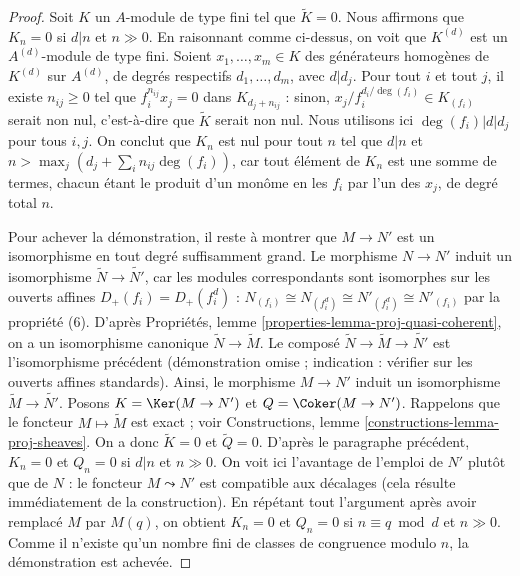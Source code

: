 \begin{proof}
\medskip\noindent
Soit $K$ un $A$-module de type fini tel que $\widetilde{K} = 0$. Nous affirmons
que $K_n = 0$ si $d|n$ et $n \gg 0$. En raisonnant comme ci-dessus, on voit que
$K^{(d)}$ est un $A^{(d)}$-module de type fini. Soient
$x_1, \ldots, x_m \in K$ des générateurs homogènes de $K^{(d)}$
sur $A^{(d)}$, de degrés respectifs $d_1, \ldots, d_m$, avec $d | d_j$.
Pour tout $i$ et tout $j$, il existe $n_{ij} \geq 0$ tel que
$f_i^{n_{ij}} x_j = 0$ dans $K_{d_j + n_{ij}}$ : sinon,
$x_j/f_i^{d_i/\deg(f_i)} \in K_{(f_i)}$ serait non nul, c'est-à-dire que
$\widetilde{K}$ serait non nul. Nous utilisons ici $\deg(f_i) | d | d_j$
pour tous $i, j$. On conclut que $K_n$ est nul pour tout
$n$ tel que $d | n$ et $n > \max_j (d_j + \sum_i n_{ij} \deg(f_i))$,
car tout élément de $K_n$ est une somme de termes, chacun étant le produit d'un
monôme en les $f_i$ par l'un des $x_j$, de degré total $n$.

\medskip\noindent
Pour achever la démonstration, il reste à montrer que $M \to N'$ est un isomorphisme
en tout degré suffisamment grand. Le morphisme $N \to N'$ induit un
isomorphisme $\widetilde{N} \to \widetilde{N'}$, car les modules correspondants sont isomorphes sur les
ouverts affines $D_+(f_i) = D_+(f_i^d)$ :
$N_{(f_i)} \cong N_{(f_i^d)} \cong N'_{(f_i^d)} \cong N'_{(f_i)}$
par la propriété (6).
D'après Propriétés, lemme \ref{properties-lemma-proj-quasi-coherent},
on a un isomorphisme canonique $\widetilde{N} \to \widetilde{M}$.
Le composé $\widetilde{N} \to \widetilde{M} \to \widetilde{N'}$
est l'isomorphisme précédent (démonstration omise ; indication : vérifier
sur les ouverts affines standards). Ainsi, le morphisme $M \to N'$ induit un isomorphisme
$\widetilde{M} \to \widetilde{N'}$.
Posons $K = \Ker(M \to N')$ et $Q = \Coker(M \to N')$.
Rappelons que le foncteur
$M \mapsto \widetilde{M}$ est exact ; voir
Constructions, lemme \ref{constructions-lemma-proj-sheaves}.
On a donc $\widetilde{K} = 0$ et $\widetilde{Q} = 0$.
D'après le paragraphe précédent, $K_n = 0$ et
$Q_n = 0$ si $d | n$ et $n \gg 0$. On voit ici l'avantage
de l'emploi de $N'$ plutôt que de $N$ : le foncteur $M \leadsto N'$
est compatible aux décalages (cela résulte immédiatement de la construction).
En répétant tout l'argument après avoir remplacé $M$ par $M(q)$,
on obtient $K_n = 0$ et $Q_n = 0$ si $n \equiv q \bmod d$
et $n \gg 0$. Comme il n'existe qu'un
nombre fini de classes de congruence modulo $n$, la démonstration est achevée.
\end{proof}


